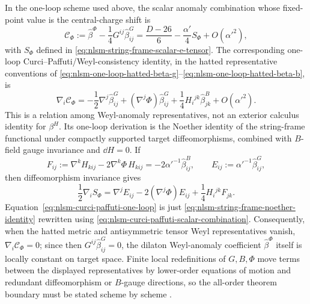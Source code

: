 \begin{controlledapproximation}
\label{capprox:nlsm-curci-paffuti-boundary}
In the one-loop scheme used above, the scalar anomaly combination whose
fixed-point value is the central-charge shift is
\begin{equation}
  \mathcal C_\Phi
  :=
  \widehat\beta^\Phi-\frac14G^{ij}\widehat\beta^G_{ij}
  =
  \frac{D-26}{6}
  -\frac{\alpha'}4 S_\Phi
  +O(\alpha'^2),
  \label{eq:nlsm-curci-paffuti-scalar-combination}
\end{equation}
with \(S_\Phi\) defined in
\eqref{eq:nlsm-string-frame-scalar-e-tensor}.  The corresponding one-loop
Curci--Paffuti/Weyl-consistency identity, in the hatted representative
conventions of
\eqref{eq:nlsm-one-loop-hatted-beta-g}--\eqref{eq:nlsm-one-loop-hatted-beta-b},
is
\begin{equation}
  \nabla_i\mathcal C_\Phi
  =
  -\frac12\nabla^j\widehat\beta^G_{ij}
  +(\nabla^j\Phi)\widehat\beta^G_{ij}
  +\frac14H_i{}^{jk}\widehat\beta^B_{jk}
  +O(\alpha'^2).
  \label{eq:nlsm-curci-paffuti-one-loop}
\end{equation}
This is a relation among Weyl-anomaly representatives, not an exterior
calculus identity for \(\beta^H\).  Its one-loop derivation is the Noether
identity of the string-frame functional under compactly supported target
diffeomorphisms, combined with \(B\)-field gauge invariance and
\(\dd H=0\).  If
\[
  F_{ij}:=\nabla^kH_{kij}-2\nabla^k\Phi\,H_{kij}
  =
  -2\alpha'^{-1}\widehat\beta^B_{ij},
  \qquad
  E_{ij}:=\alpha'^{-1}\widehat\beta^G_{ij},
\]
then diffeomorphism invariance gives
\begin{equation}
  \frac12\nabla_iS_\Phi
  =
  \nabla^jE_{ij}
  -2(\nabla^j\Phi)E_{ij}
  +\frac14H_i{}^{jk}F_{jk}.
  \label{eq:nlsm-string-frame-noether-identity}
\end{equation}
Equation~\eqref{eq:nlsm-curci-paffuti-one-loop} is just
\eqref{eq:nlsm-string-frame-noether-identity} rewritten using
\eqref{eq:nlsm-curci-paffuti-scalar-combination}.  Consequently, when the
hatted metric and antisymmetric tensor Weyl representatives vanish,
\(\nabla_i\mathcal C_\Phi=0\); since then
\(G^{ij}\widehat\beta^G_{ij}=0\), the dilaton Weyl-anomaly coefficient
\(\widehat\beta^\Phi\) itself is locally constant on target space.  Finite
local redefinitions of \(G,B,\Phi\) move terms between the displayed
representatives by lower-order equations of motion and redundant
diffeomorphism or \(B\)-gauge directions, so the all-order theorem boundary
must be stated scheme by scheme
\cite{CurciPaffuti1987,SchnittgerEllwanger1992}.
\end{controlledapproximation}

